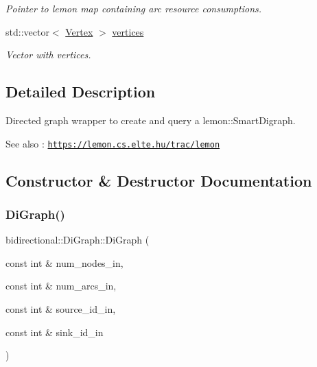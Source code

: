 \begin{DoxyCompactItemize}
\begin{DoxyCompactList}\small\item\em Pointer to lemon map containing arc resource consumptions. \end{DoxyCompactList}\item 
std\+::vector$<$ \hyperlink{structbidirectional_1_1Vertex}{Vertex} $>$ \hyperlink{classbidirectional_1_1DiGraph_ac1922b68a5f05cc890fcad5acf0b4c35}{vertices}
\begin{DoxyCompactList}\small\item\em Vector with vertices. \end{DoxyCompactList}\end{DoxyCompactItemize}


\subsection{Detailed Description}
Directed graph wrapper to create and query a lemon\+::\+Smart\+Digraph. \begin{DoxySeeAlso}{See also}
\+: \href{https://lemon.cs.elte.hu/trac/lemon}{\tt https\+://lemon.\+cs.\+elte.\+hu/trac/lemon} 
\end{DoxySeeAlso}


\subsection{Constructor \& Destructor Documentation}
\mbox{\label{classbidirectional_1_1DiGraph_a8c15d18a0760e40039441081aa88a51b}} 
\subsubsection{\texorpdfstring{Di\+Graph()}{DiGraph()}}
{\footnotesize\ttfamily bidirectional\+::\+Di\+Graph\+::\+Di\+Graph (\begin{DoxyParamCaption}\item[{const int \&}]{num\+\_\+nodes\+\_\+in,  }\item[{const int \&}]{num\+\_\+arcs\+\_\+in,  }\item[{const int \&}]{source\+\_\+id\+\_\+in,  }\item[{const int \&}]{sink\+\_\+id\+\_\+in }\end{DoxyParamCaption})}


